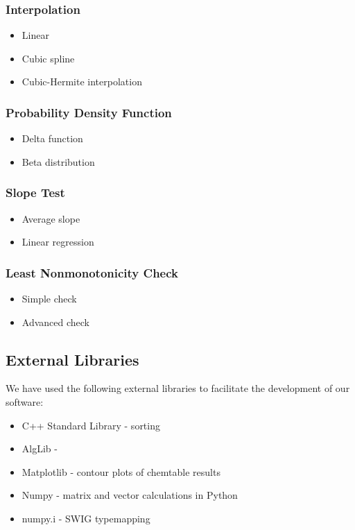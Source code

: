 \documentclass[11pt]{article}
\begin{document}
\subsubsection{Interpolation}
\begin{itemize}
\item Linear
\item Cubic spline
\item Cubic-Hermite interpolation
\end{itemize}

\subsubsection{Probability Density Function}
\begin{itemize}
\item Delta function
\item Beta distribution
\end{itemize}

\subsubsection{Slope Test}
\begin{itemize}
\item Average slope
\item Linear regression
\end{itemize}

\subsubsection{Least Nonmonotonicity Check}
\begin{itemize}
\item Simple check
\item Advanced check
\end{itemize}


\subsection{External Libraries}

We have used the following external libraries to facilitate the development of our
software:
\begin{itemize} 
\item C++ Standard Library - sorting
\item AlgLib - 
\item Matplotlib - contour plots of chemtable results
\item Numpy - matrix and vector calculations in Python
\item numpy.i - SWIG typemapping
\end{itemize}
\end{document}
